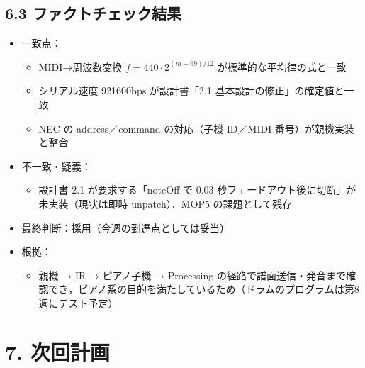 \documentclass[a4paper,11pt]{ltjsarticle}
\providecommand{\％}{\%}
\begin{document}
\subsection*{6.3 ファクトチェック結果}

\begin{itemize}
    \item 一致点：
    \begin{itemize}
        \item MIDI→周波数変換 $f=440\cdot2^{(m-69)/12}$ が標準的な平均律の式と一致
        \item シリアル速度 921600bps が設計書「2.1 基本設計の修正」の確定値と一致
        \item NEC の address／command の対応（子機 ID／MIDI 番号）が親機実装と整合
    \end{itemize}
    \item 不一致・疑義：
    \begin{itemize}
        \item 設計書 2.1 が要求する「noteOff で 0.03 秒フェードアウト後に切断」が未実装（現状は即時 unpatch）．MOP5 の課題として残存
    \end{itemize}
    \item 最終判断：採用（今週の到達点としては妥当）
    \item 根拠：
    \begin{itemize}
        \item 親機 → IR → ピアノ子機 → Processing の経路で譜面送信・発音まで確認でき，ピアノ系の目的を満たしているため（ドラムのプログラムは第8週にテスト予定）
    \end{itemize}
\end{itemize}

\section{7. 次回計画}
\end{document}
